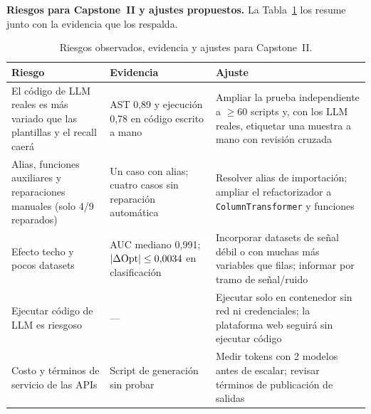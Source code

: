 \textbf{Riesgos para Capstone~II y ajustes propuestos.} La Tabla~\ref{tab:riesgos} los resume junto con la evidencia que los respalda.

\begin{table}[!htbp]
\centering
\caption{Riesgos observados, evidencia y ajustes para Capstone~II.}
\label{tab:riesgos}
\begingroup\footnotesize\singlespacing
\begin{tabular}{@{}p{4.4cm} p{4.0cm} p{6.6cm}@{}}
\toprule
Riesgo & Evidencia & Ajuste \\
\midrule
El código de LLM reales es más variado que las plantillas y el recall caerá & AST 0,89 y ejecución 0,78 en código escrito a mano & Ampliar la prueba independiente a $\geq 60$ scripts y, con los LLM reales, etiquetar una muestra a mano con revisión cruzada \\
Alias, funciones auxiliares y reparaciones manuales (solo 4/9 reparados) & Un caso con alias; cuatro casos sin reparación automática & Resolver alias de importación; ampliar el refactorizador a \texttt{ColumnTransformer} y funciones \\
Efecto techo y pocos datasets & AUC mediano 0,991; $|\Delta\mathrm{Opt}|\leq 0{,}0034$ en clasificación & Incorporar datasets de señal débil o con muchas más variables que filas; informar \DOpt{} por tramo de señal/ruido \\
Ejecutar código de LLM es riesgoso & --- & Ejecutar solo en contenedor sin red ni credenciales; la plataforma web seguirá sin ejecutar código \\
Costo y términos de servicio de las APIs & Script de generación sin probar & Medir tokens con 2 modelos antes de escalar; revisar términos de publicación de salidas \\
\bottomrule
\end{tabular}
\endgroup
\end{table}
